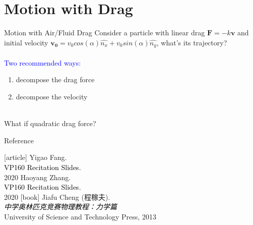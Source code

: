 \documentclass{beamer}
\begin{document}
\section{Motion with Drag}
\begin{frame}{Motion with Air/Fluid Drag}
  Consider a particle with linear drag $\mathbf{F} = -k\mathbf{v}$ and initial velocity $\mathbf{v_0} = v_0cos(\alpha)\hat{n_x} + v_0sin(\alpha)\hat{n_y}$, what's its trajectory? \\
  ~\\
  \textcolor{blue}{Two recommended ways:}\\
  \begin{enumerate}
    \item decompose the drag force
    \item decompose the velocity
  \end{enumerate}
  ~\\
  What if quadratic drag force?
\end{frame}


\begin{frame}{Reference}
  \begin{thebibliography}{9}
  [article]
   Yigao Fang.\\
  \textcolor{black}{VP160 Recitation Slides.}\\
  2020
   Haoyang Zhang.\\
  \textcolor{black}{VP160 Recitation Slides.}\\
  2020
  [book]
   Jiafu Cheng (程稼夫).\\
  \textcolor{black}{\textit{中学奥林匹克竞赛物理教程：力学篇}}\\
  University of Science and Technology Press, 2013
  \end{thebibliography}
  \end{frame}
  
\end{document}
